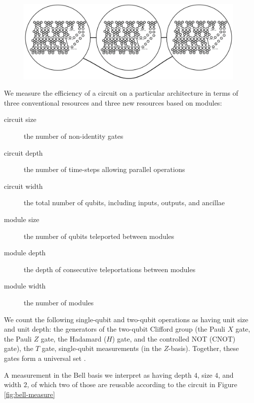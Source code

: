\documentclass[twoside]{article}
\begin{document}
\begin{figure}[b!]
\begin{center}
\includegraphics[width=5in]{./modules.pdf}
\end{center}
\label{fig:modules}
\end{figure}

We measure the efficiency of a circuit on a particular
architecture in terms of three conventional resources and three
new resources based on modules:

\begin{description}

\item[circuit size] the number of non-identity gates
\item[circuit depth] the number of time-steps allowing parallel operations
\item[circuit width] the total number of qubits, including inputs, outputs, and ancillae
\item[module size] the number of qubits teleported between modules
\item[module depth] the depth of consecutive teleportations between modules
\item[module width] the number of modules
\end{description}

We count the following single-qubit and two-qubit operations as
having unit size and
unit depth: the generators of the two-qubit Clifford group
(the Pauli $X$ gate, the Pauli $Z$ gate, the Hadamard ($H$) gate, and the
controlled NOT (CNOT) gate), the $T$ gate, single-qubit measurements
(in the $Z$-basis).
Together, these gates form a universal set \cite{Kitaev2002}.

A measurement in the Bell basis we interpret as having depth $4$,
size $4$, and width $2$, of which two of those are reusable according
to the circuit in Figure \ref{fig:bell-measure}

\end{document}

